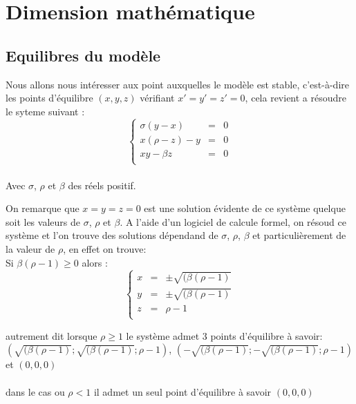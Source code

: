 \section{Dimension mathématique}

\subsection{Equilibres du modèle}
Nous allons nous intéresser aux point auxquelles le modèle est stable, c’est-à-dire les points d’équilibre $(x,y,z)$ vérifiant $x'=y'=z'=0$, cela revient a résoudre le syteme suivant :\\
\[
    \left\{
    \begin{array}{rcl}
        \sigma(y-x)&=&0\\
        x(\rho-z)-y&=&0\\
        xy-\beta z&=&0\\
    \end{array}
    \right.
\]\\

Avec $\sigma$, $\rho$ et $\beta$ des réels positif.

On remarque que $x=y=z=0$ est une solution évidente de ce système quelque soit les valeurs de $\sigma$, $\rho$ et $\beta$.
A l'aide d'un logiciel de calcule formel, on résoud ce système et l'on trouve des solutions dépendand de $\sigma$, $\rho$, $\beta$ et particulièrement de la valeur de $\rho$, en effet on trouve:\\

Si $\beta(\rho-1)\geq 0$ alors :
\[
    \left\{
    \begin{array}{rcl}
        x&=& \pm \sqrt{(\beta(\rho-1)}\\
        y&=& \pm \sqrt{(\beta(\rho-1)}\\
        z&=&\rho-1\\
    \end{array}
    \right.
\]

autrement dit lorsque $\rho\geq 1$ le système admet 3 points d'équilibre à savoir:\\
 $(\sqrt{(\beta(\rho-1)}; \sqrt{(\beta(\rho-1)}; \rho-1)$, $(-\sqrt{(\beta(\rho-1)}; -\sqrt{(\beta(\rho-1)}; \rho-1)$ et $(0,0,0)$\\\\
 dans le cas ou $\rho < 1$ il admet un seul point d'équilibre à savoir $(0,0,0)$\\
 
